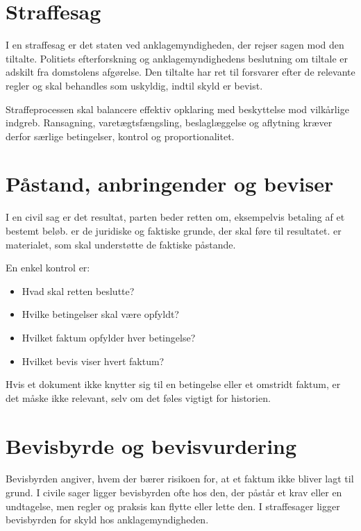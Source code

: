 \section{Straffesag}

I en straffesag er det staten ved anklagemyndigheden, der rejser sagen mod den tiltalte. Politiets efterforskning og anklagemyndighedens beslutning om tiltale er adskilt fra domstolens afgørelse. Den tiltalte har ret til forsvarer efter de relevante regler og skal behandles som uskyldig, indtil skyld er bevist.

Straffeprocessen skal balancere effektiv opklaring med beskyttelse mod vilkårlige indgreb. Ransagning, varetægtsfængsling, beslaglæggelse og aflytning kræver derfor særlige betingelser, kontrol og proportionalitet.

\section{Påstand, anbringender og beviser}

I en civil sag er  det resultat, parten beder retten om, eksempelvis betaling af et bestemt beløb.  er de juridiske og faktiske grunde, der skal føre til resultatet.  er materialet, som skal understøtte de faktiske påstande.

En enkel kontrol er:
\begin{itemize}
  \item Hvad skal retten beslutte?
  \item Hvilke betingelser skal være opfyldt?
  \item Hvilket faktum opfylder hver betingelse?
  \item Hvilket bevis viser hvert faktum?
\end{itemize}

Hvis et dokument ikke knytter sig til en betingelse eller et omstridt faktum, er det måske ikke relevant, selv om det føles vigtigt for historien.

\section{Bevisbyrde og bevisvurdering}

Bevisbyrden angiver, hvem der bærer risikoen for, at et faktum ikke bliver lagt til grund. I civile sager ligger bevisbyrden ofte hos den, der påstår et krav eller en undtagelse, men regler og praksis kan flytte eller lette den. I straffesager ligger bevisbyrden for skyld hos anklagemyndigheden.

